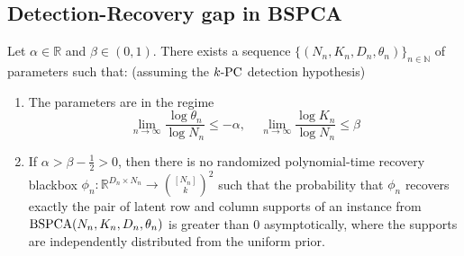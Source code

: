 \documentclass[final,12pt]{colt2023} %
\newcommand\1[1]{\mathbb{I}_{\left\{#1\right\}}}
\begin{document}
\subsection{Detection-Recovery gap in BSPCA}
\begin{theorem}
Let $\alpha \in \mathbb{R}$ and $\beta \in (0, 1)$. There exists a sequence $\{ (N_n, K_n, D_n, \theta_n) \}_{n \in \mathbb{N}}$ of parameters such that: (assuming the $k\textup{-PC}$ detection hypothesis)
\begin{enumerate}
\item The parameters are in the regime
$$\lim_{n \to \infty} \frac{\log \theta_n}{\log N_n} \leq -\alpha, \;\;\;\; \lim_{n \to \infty} \frac{\log K_n}{\log N_n} \leq \beta$$
\item If $\alpha > \beta-\frac{1}{2}>0$, then there is no randomized polynomial-time recovery blackbox $\phi_n : \mathbb{R}^{D_n \times N_n} \to \binom{[N_n]}{k}^2$ such that the probability that $\phi_n$ recovers exactly the pair of latent row and column supports of an instance from $\textup{BSPCA}(N_n, K_n, D_n, \theta_n)$ is greater than 0 asymptotically, where the supports are independently distributed from the uniform prior.
\end{enumerate}
\end{theorem}
\end{document}
